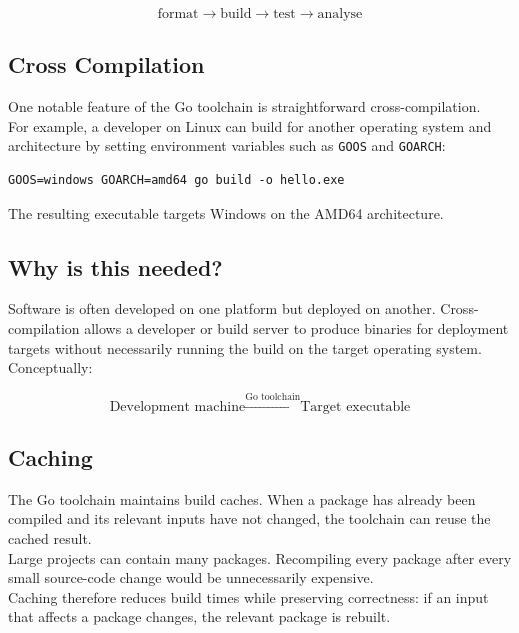\[
\text{format}
\rightarrow
\text{build}
\rightarrow
\text{test}
\rightarrow
\text{analyse}
\]

\subsection{Cross Compilation}

One notable feature of the Go toolchain is straightforward
cross-compilation.\\

For example, a developer on Linux can build for another operating
system and architecture by setting environment variables such as
\texttt{GOOS} and \texttt{GOARCH}:

\begin{lstlisting}
GOOS=windows GOARCH=amd64 go build -o hello.exe
\end{lstlisting}

The resulting executable targets Windows on the AMD64 architecture.

\subsection*{Why is this needed?}

Software is often developed on one platform but deployed on another.
Cross-compilation allows a developer or build server to produce
binaries for deployment targets without necessarily running the build
on the target operating system.\\

Conceptually:

\[
\text{Development machine}
\xrightarrow{\text{Go toolchain}}
\text{Target executable}
\]

\subsection{Caching}

The Go toolchain maintains build caches.  When a package has already
been compiled and its relevant inputs have not changed, the toolchain
can reuse the cached result.\\

Large projects can contain many packages.  Recompiling every package
after every small source-code change would be unnecessarily expensive.\\

Caching therefore reduces build times while preserving correctness:
if an input that affects a package changes, the relevant package is
rebuilt.\\

